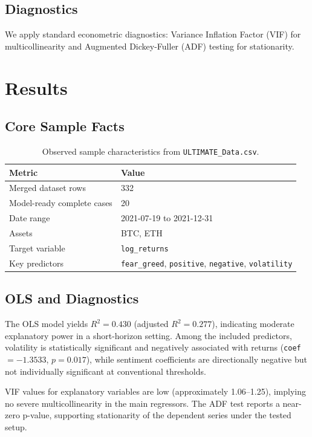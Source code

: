 \documentclass[12pt]{article}
\begin{document}
\subsection{Diagnostics}
We apply standard econometric diagnostics: Variance Inflation Factor (VIF) for multicollinearity and Augmented Dickey-Fuller (ADF) testing for stationarity.

\section{Results}
\subsection{Core Sample Facts}
\begin{table}[H]
\centering
\begin{tabular}{ll}
\toprule
Metric & Value \\
\midrule
Merged dataset rows & 332 \\
Model-ready complete cases & 20 \\
Date range & 2021-07-19 to 2021-12-31 \\
Assets & BTC, ETH \\
Target variable & \texttt{log\_returns} \\
Key predictors & \texttt{fear\_greed}, \texttt{positive}, \texttt{negative}, \texttt{volatility} \\
\bottomrule
\end{tabular}
\caption{Observed sample characteristics from \texttt{ULTIMATE\_Data.csv}.}
\end{table}

\subsection{OLS and Diagnostics}
The OLS model yields $R^2 = 0.430$ (adjusted $R^2 = 0.277$), indicating moderate explanatory power in a short-horizon setting. Among the included predictors, volatility is statistically significant and negatively associated with returns (\texttt{coef} $=-1.3533$, $p=0.017$), while sentiment coefficients are directionally negative but not individually significant at conventional thresholds.

VIF values for explanatory variables are low (approximately 1.06--1.25), implying no severe multicollinearity in the main regressors. The ADF test reports a near-zero p-value, supporting stationarity of the dependent series under the tested setup.
\end{document}
